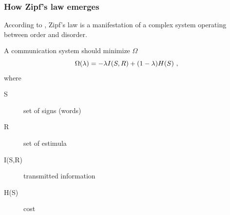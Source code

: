 \documentclass[notes]{beamer}
\begin{document}
\frame
{
  \frametitle{How Zipf's law emerges}
  According to \cite{ramon2003,ferrer05}, Zipf's law is a manifestation
  of a complex system operating between order and disorder.

  \vspace{0.5cm}
  A communication system should minimize $\Omega$ 
  \begin{equation}
  \Omega(\lambda) = - \lambda I(S,R) + (1-\lambda) H(S) \textmd{ ,}
  \end{equation}
  where
  \begin{description}
  \item[S] set of signs (words)
  \item[R] set of estimula 
  \item[I(S,R)] transmitted information 
  \item[H(S)] cost
  \end{description}
}
\end{document}
